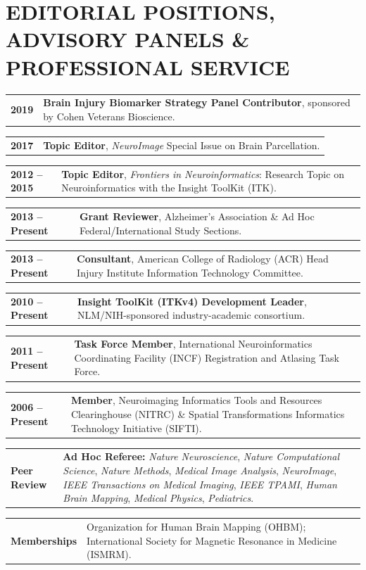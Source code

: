 \documentclass[10pt,letterpaper]{article}
\makeatletter
\newcommand{\cvline}[2]{%
  \noindent\begin{tabularx}{\textwidth}{@{} >{\raggedright\arraybackslash\bfseries\footnotesize\color{accent}}p{1.15in} >{\footnotesize\arraybackslash}X @{}}
    #1 & #2
  \end{tabularx}\par\vspace{2pt}%
}
\makeatother
\begin{document}
\section{EDITORIAL POSITIONS, ADVISORY PANELS \& PROFESSIONAL SERVICE}
\cvline{2019}{\textbf{Brain Injury Biomarker Strategy Panel Contributor}, sponsored by Cohen Veterans Bioscience.}
\cvline{2017}{\textbf{Topic Editor}, \textit{NeuroImage} Special Issue on Brain Parcellation.}
\cvline{2012 -- 2015}{\textbf{Topic Editor}, \textit{Frontiers in Neuroinformatics}: Research Topic on Neuroinformatics with the Insight ToolKit (ITK).}
\cvline{2013 -- Present}{\textbf{Grant Reviewer}, Alzheimer's Association \& Ad Hoc Federal/International Study Sections.}
\cvline{2013 -- Present}{\textbf{Consultant}, American College of Radiology (ACR) Head Injury Institute Information Technology Committee.}
\cvline{2010 -- Present}{\textbf{Insight ToolKit (ITKv4) Development Leader}, NLM/NIH-sponsored industry-academic consortium.}
\cvline{2011 -- Present}{\textbf{Task Force Member}, International Neuroinformatics Coordinating Facility (INCF) Registration and Atlasing Task Force.}
\cvline{2006 -- Present}{\textbf{Member}, Neuroimaging Informatics Tools and Resources Clearinghouse (NITRC) \& Spatial Transformations Informatics Technology Initiative (SIFTI).}
\cvline{Peer Review}{\textbf{Ad Hoc Referee:} \textit{Nature Neuroscience}, \textit{Nature Computational Science}, \textit{Nature Methods}, \textit{Medical Image Analysis}, \textit{NeuroImage}, \textit{IEEE Transactions on Medical Imaging}, \textit{IEEE TPAMI}, \textit{Human Brain Mapping}, \textit{Medical Physics}, \textit{Pediatrics}.}
\cvline{Memberships}{Organization for Human Brain Mapping (OHBM); International Society for Magnetic Resonance in Medicine (ISMRM).}

\end{document}
